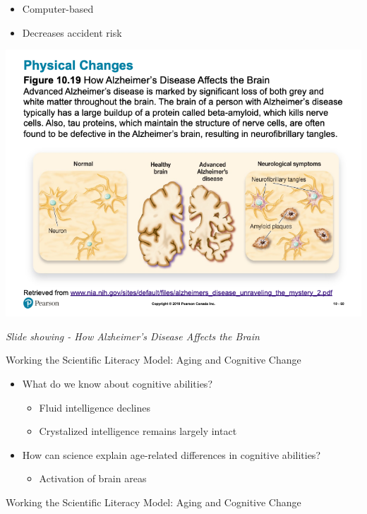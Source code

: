 \documentclass[
]{book}
\providecommand{\tightlist}{%
  \setlength{\itemsep}{0pt}\setlength{\parskip}{0pt}}
\begin{document}
\begin{reflect}
\begin{itemize}
  \begin{itemize}
  \tightlist
  \item
    Computer-based
  \item
    Decreases accident risk
  \end{itemize}
\end{itemize}

\includegraphics{assets/unit_3/slide_60.png}

\emph{Slide showing - How Alzheimer's Disease Affects the Brain}

Working the Scientific Literacy Model: Aging and Cognitive Change

\begin{itemize}
\tightlist
\item
  What do we know about cognitive abilities?

  \begin{itemize}
  \tightlist
  \item
    Fluid intelligence declines
  \item
    Crystalized intelligence remains largely intact
  \end{itemize}
\item
  How can science explain age-related differences in cognitive abilities?

  \begin{itemize}
  \tightlist
  \item
    Activation of brain areas
  \end{itemize}
\end{itemize}

Working the Scientific Literacy Model: Aging and Cognitive Change


\end{reflect}
\end{document}
